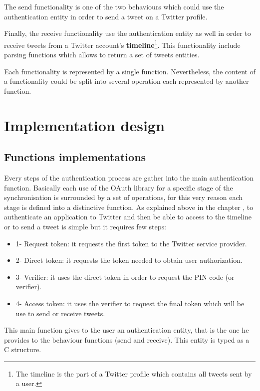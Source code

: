 The send functionality is one of the two behaviours which could use the authentication entity in order to send a tweet on a Twitter profile.

Finally, the receive functionality use the authentication entity as well in order to receive tweets from a Twitter account's \textbf{timeline}\footnote{The timeline is the part of a Twitter profile which contains all tweets sent by a user.}. This functionality include parsing functions which allows to return a set of tweets entities. 

Each functionality is represented by a single function. Nevertheless, the content of a functionality could be split into several operation each represented by another function.



\section{Implementation design}


\subsection{Functions implementations}


\hspace{15mm}Every steps of the authentication process are gather into the main authentication function. Basically each use of the OAuth library for a specific stage of the synchronisation is surrounded by a set of operations, for this very reason each stage is defined into a distinctive function. As explained above in the chapter , to authenticate an application to Twitter and then be able to access to the timeline or to send a tweet is simple but it requires few steps:
\begin{itemize}
\item 1- Request token: it requests the first token to the Twitter service provider.
\item 2- Direct token: it requests the token needed to obtain user authorization.
\item 3- Verifier: it uses the direct token in order to request the PIN code (or verifier). 
\item 4- Access token: it uses the verifier to request the final token which will be use to send or receive tweets.
\end{itemize}
This main function gives to the user an authentication entity, that is the one he provides to the behaviour functions (send and receive). This entity is typed as a C structure.

